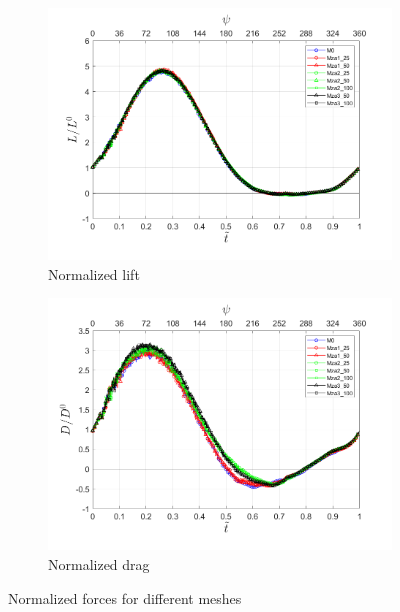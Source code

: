 


\begin{figure}[H]
\centering

\begin{subfigure}[b]{0.7\textwidth}
\centering
\includegraphics[width=1\textwidth]{figures/zonal_adapt_results/force_response/Lift.png}
\caption{Normalized lift}
\label{fig:lift_zonal_adapt}
\end{subfigure}
\begin{subfigure}[b]{0.7\textwidth}
\centering
\includegraphics[width=1\textwidth]{figures/zonal_adapt_results/force_response/Drag.png}
\caption{Normalized drag}
\label{fig:drag_zonal adapt}
\end{subfigure}

\label{fig:force_response_zonal_adapt}
\caption{Normalized forces for different meshes}
\end{figure}